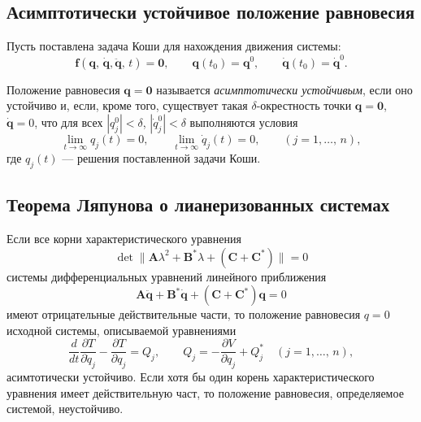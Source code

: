 \documentclass[a4paper]{article}
\begin{document}
\subsection{Асимптотически устойчивое положение равновесия}
	Пусть 
	поставлена задача Коши для нахождения движения системы:
	\[
		\mathbf{f}\left( \mathbf{q},\,\dot{\mathbf{q}},
		\ddot{\mathbf{q}},\,t \right) =\mathbf{0}, \qquad
		\mathbf{q}(t_0)=\mathbf{q}^0,\qquad
		\dot{\mathbf{q}}(t_0)=\dot{\mathbf{q}}^0
	.\] 
\begin{dfn}
	Положение равновесия $\mathbf{q}=\mathbf{0}$ называется \emph{асимптотически
	устойчивым},
	если оно устойчиво и, если, кроме того, существует такая 
	$\delta$-окрестность точки $\mathbf{q}=\mathbf{0}$, $\dot{\mathbf{q}}=0$,
	что для всех $|q_j^0|<\delta$, $|\dot{q}_j^0|< \delta$ выполняются
	условия
	\[
		\lim_{t \to \infty} q_j (t)=0, \qquad \lim_{t \to \infty} 
		\dot{q}_j(t)=0,\qquad (j=1,\ldots,\,n)
	,\]
	где $q_j(t)$ --- решения поставленной задачи Коши.
\end{dfn}
\subsection{Теорема Ляпунова о лианеризованных системах}
\begin{thm}
	Если все корни характеристического уравнения
\[
	\det \|\mathbf{A}\lambda^2+\mathbf{B}^* \lambda +(\mathbf{C}+
	\mathbf{C}^*)\|=0
\]
системы дифференциальных уравнений линейного приближения
\[
	\mathbf{A}\ddot{\mathbf{q}}+\mathbf{B}^* \dot{\mathbf{q}}+
	(\mathbf{C}+\mathbf{C}^*)\mathbf{q}=0
\]
имеют отрицательные действительные части, то положение равновесия  $q=0$
исходной системы, описываемой уравнениями
\[
	\frac{d}{dt} \frac{\partial T}{\partial \dot{q}_j} -\frac{\partial T}{\partial q_j} =
	Q_j,\qquad Q_j=-\frac{\partial V}{\partial q_j} +Q_j^* \quad (j=1,\ldots,
	\,n)
,\] 
асимтотически устойчиво. Если хотя бы один корень характеристического уравнения
имеет действительную част, то положение равновесия, определяемое системой,
неустойчиво.
\end{thm}
\end{document}

